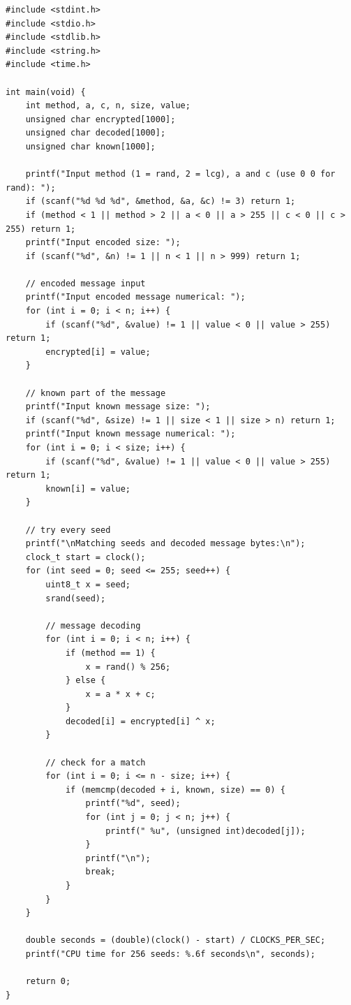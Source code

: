 \documentclass[a4paper,10pt]{article}
\begin{document}
\begin{lstlisting}[style = code, title = brute\_force.c]
#include <stdint.h>
#include <stdio.h>
#include <stdlib.h>
#include <string.h>
#include <time.h>

int main(void) {
    int method, a, c, n, size, value;
    unsigned char encrypted[1000];
    unsigned char decoded[1000];
    unsigned char known[1000];

    printf("Input method (1 = rand, 2 = lcg), a and c (use 0 0 for rand): ");
    if (scanf("%d %d %d", &method, &a, &c) != 3) return 1;
    if (method < 1 || method > 2 || a < 0 || a > 255 || c < 0 || c > 255) return 1;
    printf("Input encoded size: ");
    if (scanf("%d", &n) != 1 || n < 1 || n > 999) return 1;

    // encoded message input
    printf("Input encoded message numerical: ");
    for (int i = 0; i < n; i++) {
        if (scanf("%d", &value) != 1 || value < 0 || value > 255) return 1;
        encrypted[i] = value;
    }

    // known part of the message
    printf("Input known message size: ");
    if (scanf("%d", &size) != 1 || size < 1 || size > n) return 1;
    printf("Input known message numerical: ");
    for (int i = 0; i < size; i++) {
        if (scanf("%d", &value) != 1 || value < 0 || value > 255) return 1;
        known[i] = value;
    }

    // try every seed
    printf("\nMatching seeds and decoded message bytes:\n");
    clock_t start = clock();
    for (int seed = 0; seed <= 255; seed++) {
        uint8_t x = seed;
        srand(seed);

        // message decoding
        for (int i = 0; i < n; i++) {
            if (method == 1) {
                x = rand() % 256;
            } else {
                x = a * x + c;
            }
            decoded[i] = encrypted[i] ^ x;
        }

        // check for a match
        for (int i = 0; i <= n - size; i++) {
            if (memcmp(decoded + i, known, size) == 0) {
                printf("%d", seed);
                for (int j = 0; j < n; j++) {
                    printf(" %u", (unsigned int)decoded[j]);
                }
                printf("\n");
                break;
            }
        }
    }

    double seconds = (double)(clock() - start) / CLOCKS_PER_SEC;
    printf("CPU time for 256 seeds: %.6f seconds\n", seconds);

    return 0;
}
\end{lstlisting}
\end{document}
